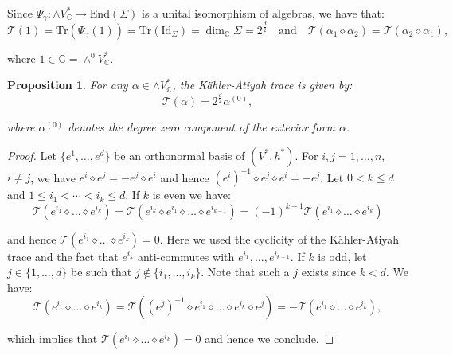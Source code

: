 \documentclass[10pt,a4paper,twoside,reqno]{amsart}
\theoremstyle{plain}
\newtheorem{prop}[thm]{Proposition}
\theoremstyle{definition}
\theoremstyle{remark}
\newcommand{\End}{\mathrm{End}}
\def\C{\mathbb{C}}
\def\Id{\mathrm{Id}}
\newcommand{\Tr}{\mathrm{Tr}}
\def\cT{\mathcal{T}}
\begin{document}
\noindent
Since $\Psi_\gamma\colon\wedge V^*_\C\to\End(\Sigma)$ is a unital isomorphism of algebras, we have that:
\begin{equation*}
 \mathcal{T}(1)=\Tr(\Psi_\gamma(1))=\Tr(\Id_\Sigma)=\dim_\C\Sigma=2^{\frac{d}{2}}\quad\text{and}\quad\mathcal{T}(\alpha_1\diamond\alpha_2)=\mathcal{T}(\alpha_2\diamond\alpha_1),
\end{equation*}

\noindent
where $1\in\C=\wedge^0V^*_\C$.

\begin{prop}
For any $\alpha\in\wedge V^*_\C$, the Kähler-Atiyah trace is given by: 
\begin{equation*}
 \mathcal{T}(\alpha)=2^{\frac{d}{2}}\alpha^{(0)},
\end{equation*}

\noindent
where $\alpha^{(0)}$ denotes the degree zero component of the exterior form $\alpha$.
\end{prop}

\begin{proof}
Let $\{e^1, \hdots, e^d\}$ be an orthonormal basis of $(V^{\ast},h^{\ast})$. For $i,j = 1 , \hdots, n$, $i\neq j$, we have $e^i\diamond e^j = - e^j\diamond e^i$ and hence $(e^i)^{-1}\diamond e^j\diamond e^i = - e^j$. Let $0 < k \leq d$ and $1\leq i_1 < \cdots < i_k \leq d$. If $k$ is even we have:
\begin{equation*}
\cT(e^{i_1}\diamond \dots \diamond e^{i_{k}}) = \cT(e^{i_k}\diamond
e^{i_1}\diamond \dots \diamond e^{i_{k-1}}) = (-1)^{k-1}
\cT(e^{i_1}\diamond \dots \diamond e^{i_{k}})
\end{equation*}

\noindent
and hence $\cT(e^{i_1}\diamond \dots \diamond e^{i_{k}}) = 0$. Here we used the cyclicity of the Kähler-Atiyah trace and the fact that $e^{i_{k}}$ anti-commutes with $e^{i_1}, \dots, e^{i_{k-1}}$. If $k$ is odd, let $j\in\{1,\dots,d\}$ be such that $j\not\in\{i_1,\dots,i_k\}$. Note that such a $j$ exists since $k<d$. We have:
\begin{equation*}
\cT(e^{i_1}\diamond \dots \diamond e^{i_{k}}) = \cT(( e^j)^{-1} \diamond e^{i_1}\diamond \dots 
\diamond e^{i_{k}}\diamond e^j) = -  \cT( e^{i_1}\diamond \dots \diamond e^{i_{k}}),
\end{equation*}

\noindent
which implies that $\mathcal{T}(e^{i_1}\diamond \dots \diamond e^{i_k})=0$ and hence we conclude.
\end{proof}
\end{document}
